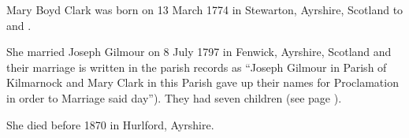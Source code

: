 
Mary Boyd Clark was born on 13 March 1774 in Stewarton, Ayrshire, Scotland to  and .

She married Joseph Gilmour on 8 July 1797 in Fenwick, Ayrshire, Scotland \cite{MBClarkMarriage} and their marriage is written in the parish records as ``Joseph Gilmour in Parish of Kilmarnock and Mary Clark in this Parish gave up their names for Proclamation in order to Marriage said day''). They had seven children (see page \pageref{Joseph_Gilmour}).

She died before 1870 in Hurlford, Ayrshire.\cite{JosephGilmourDeath}

